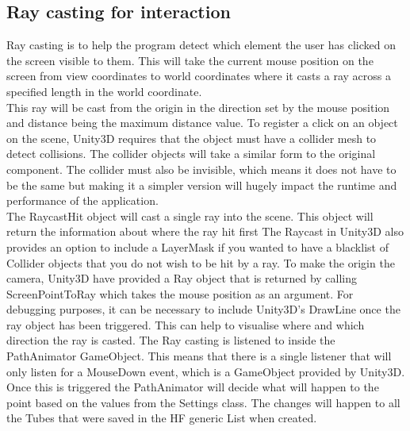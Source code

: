 \documentclass[12pt]{article} %
\begin{document}
\begin{flushleft}
\subsection{Ray casting for interaction} %
Ray casting is to help the program detect which element the user has clicked on the screen visible to them. This will take the current mouse position on the screen from view coordinates to world coordinates where it casts a ray across a specified length in the world coordinate.\\
This ray will be cast from the origin in the direction set by the mouse position and distance being the maximum distance value. 
To register a click on an object on the scene, Unity3D requires that the object must have a collider mesh to detect collisions. The collider objects will take a similar form to the original component. The collider must also be invisible, which means it does not have to be the same but making it a simpler version will hugely impact the runtime and performance of the application.\\
The RaycastHit object will cast a single ray into the scene. This object will return the information about where the ray hit first
The Raycast in Unity3D also provides an option to include a LayerMask if you wanted to have a blacklist of Collider objects that you do not wish to be hit by a ray.
To make the origin the camera, Unity3D have provided a Ray object that is returned by calling ScreenPointToRay which takes the mouse position as an argument.
For debugging purposes, it can be necessary to include Unity3D's DrawLine once the ray object has been triggered. This can help to visualise where and which direction the ray is casted.
The Ray casting is listened to inside the PathAnimator GameObject. This means that there is a single listener that will only listen for a MouseDown event, which is a GameObject provided by Unity3D. Once this is triggered the PathAnimator will decide what will happen to the point based on the values from the Settings class. The changes will happen to all the Tubes that were saved in the HF generic List when created.
\newpage

\end{flushleft}
\end{document}
